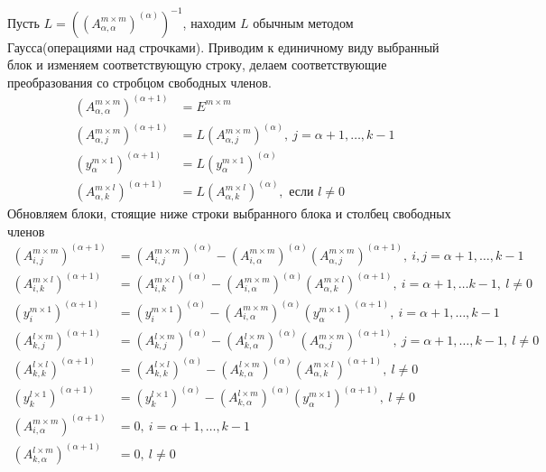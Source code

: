 \documentclass[a4paper,12pt]{article}
\newcommand{\br}[1]{\left(#1\right)}
\begin{document}
Пусть $L = \br{\br{A_{\alpha, \alpha}^{m \times m}}^{(\alpha)}}^{-1}$, находим $L$ обычным методом Гаусса(операциями над строчками). Приводим к единичному виду выбранный блок и изменяем соответствующую строку, делаем соответствующие преобразования со стробцом свободных членов.
\begin{align*}
    \br{A_{\alpha, \alpha}^{m \times m}}^{(\alpha + 1)}     & = E^{m \times m} \\
    \br{A_{\alpha, j}^{m \times m}}^{(\alpha + 1)}          & = L \br{A_{\alpha, j}^{m \times m}}^{(\alpha)}, \ j = \alpha + 1, \dots, k - 1 \\
    \br{y_{\alpha}^{m \times 1}}^{(\alpha + 1)}             & = L \br{y_{\alpha}^{m \times 1}}^{(\alpha)} \\
    \br{A_{\alpha, k}^{m \times l}}^{(\alpha + 1)}          & = L \br{A_{\alpha, k}^{m \times l}}^{(\alpha)}, \text{ если } l \neq 0
\end{align*}
Обновляем блоки, стоящие ниже строки выбранного блока и столбец свободных членов
\begin{align*}
    \br{A_{i, j}^{m \times m}}^{(\alpha + 1)} & = \br{A_{i, j}^{m \times m}}^{(\alpha)} - \br{A_{i, \alpha}^{m \times m}}^{(\alpha)} \br{A_{\alpha, j}^{m \times m}}^{(\alpha + 1)}, \ i, j = \alpha + 1, \dots, k - 1 \\
    \br{A_{i, k}^{m \times l}}^{(\alpha + 1)} & = \br{A_{i, k}^{m \times l}}^{(\alpha)} - \br{A_{i, \alpha}^{m \times m}}^{(\alpha)} \br{A_{\alpha, k}^{m \times l}}^{(\alpha + 1)}, \ i = \alpha + 1, \dots k - 1, \ l \neq 0 \\
    \br{y_{i}^{m \times 1}}^{(\alpha + 1)} & = \br{y_{i}^{m \times 1}}^{(\alpha)} - \br{A_{i, \alpha}^{m \times m}}^{(\alpha)} \br{y_{\alpha}^{m \times 1}}^{(\alpha + 1)}, \ i = \alpha + 1, \dots, k - 1 \\
    \br{A_{k, j}^{l \times m}}^{(\alpha + 1)} & = \br{A_{k, j}^{l \times m}}^{(\alpha)} - \br{A_{k, \alpha}^{l \times m}}^{(\alpha)} \br{A_{\alpha, j}^{m \times m}}^{(\alpha + 1)}, \ j = \alpha + 1, \dots, k - 1, \ l \neq 0 \\
    \br{A_{k, k}^{l \times l}}^{(\alpha + 1)} & = \br{A_{k, k}^{l \times l}}^{(\alpha)} - \br{A_{k, \alpha}^{l \times m}}^{(\alpha)} \br{A_{\alpha, k}^{m \times l}}^{(\alpha + 1)}, \ l \neq 0 \\
    \br{y_{k}^{l \times 1}}^{(\alpha + 1)} & = \br{y_{k}^{l \times 1}}^{(\alpha)} - \br{A_{k, \alpha}^{l \times m}}^{(\alpha)} \br{y_{\alpha}^{m \times 1}}^{(\alpha + 1)}, \ l \neq 0 \\
    \br{A_{i, \alpha}^{m \times m}}^{(\alpha + 1)} & = 0, \ i = \alpha + 1, \dots, k - 1 \\
    \br{A_{k, \alpha}^{l \times m}}^{(\alpha + 1)} & = 0, \ l \neq 0 \\
\end{align*}
\end{document}
